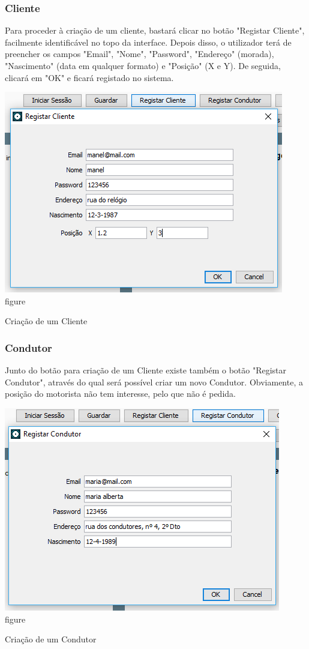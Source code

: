 \documentclass[a4paper]{article}
\begin{document}
\subsubsection{Cliente}
Para proceder à criação de um cliente, bastará clicar no botão "Registar Cliente", facilmente identificável no topo da interface. Depois disso, o utilizador terá de preencher os campos "Email", "Nome", "Password", "Endereço" (morada), "Nascimento" (data em qualquer formato) e "Posição" (X e Y). De seguida, clicará em "OK" e ficará registado no sistema.
\begin{center}
  \includegraphics[scale=0.75]{criar_cliente}\\
  \caption{figure}{Criação de um Cliente}
  \label{fig:picture}
\end{center}

\subsubsection{Condutor}
Junto do botão para criação de um Cliente existe também o botão "Registar Condutor", através do qual será possível criar um novo Condutor. Obviamente, a posição do motorista não tem interesse, pelo que não é pedida.
\begin{center}
  \includegraphics[scale=0.75]{criar_condutor}\\
  \caption{figure}{Criação de um Condutor}
  \label{fig:picture}
\end{center}
\end{document}
